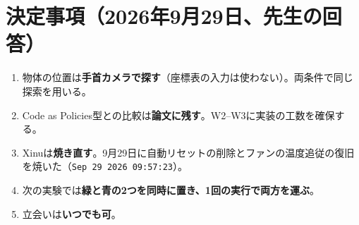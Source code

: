 \documentclass[11pt,a4paper]{article}
\begin{document}
\section*{決定事項（2026年9月29日、先生の回答）}
\begin{enumerate}
\item 物体の位置は\textbf{手首カメラで探す}（座標表の入力は使わない）。両条件で同じ探索を用いる。
\item Code as Policies型との比較は\textbf{論文に残す}。W2--W3に実装の工数を確保する。
\item Xinuは\textbf{焼き直す}。9月29日に自動リセットの削除とファンの温度追従の復旧を焼いた（\texttt{Sep 29 2026 09:57:23}）。
\item 次の実験では\textbf{緑と青の2つを同時に置き、1回の実行で両方を運ぶ}。
\item 立会いは\textbf{いつでも可}。
\end{enumerate}
\end{document}
